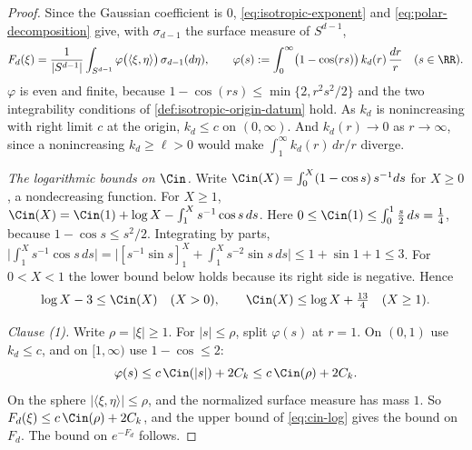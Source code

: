 \begin{proof}
\leanok
Since the Gaussian coefficient is $0$, \ref{eq:isotropic-exponent} and \ref{eq:polar-decomposition}
give, with $\sigma_{d-1}$ the surface measure of $S^{d-1}$,
\[
  F_d(\xi) = \frac{1}{|S^{d-1}|}\int_{S^{d-1}}\varphi\bigl(\langle\xi,\eta\rangle\bigr)\,\sigma_{d-1}(d\eta),
  \qquad
  \varphi(s) := \int_0^\infty\bigl(1 - \cos(rs)\bigr)\,k_d(r)\,\frac{dr}{r} \quad (s \in \RR).
\]
$\varphi$ is even and finite, because $1 - \cos(rs) \le \min\{2, r^2s^2/2\}$ and the two
integrability conditions of \ref{def:isotropic-origin-datum} hold. As $k_d$ is nonincreasing with
right limit $c$ at the origin, $k_d \le c$ on $(0,\infty)$. And $k_d(r) \to 0$ as $r \to \infty$,
since a nonincreasing $k_d \ge \ell > 0$ would make $\int_1^\infty k_d(r)\,dr/r$ diverge.

\emph{The logarithmic bounds on $\Cin$.} Write $\Cin(X) = \int_0^X(1-\cos s)\,s^{-1}ds$ for
$X \ge 0$, a nondecreasing function. For $X \ge 1$,
$\Cin(X) = \Cin(1) + \log X - \int_1^X s^{-1}\cos s\,ds$. Here $0 \le \Cin(1) \le \int_0^1 \tfrac s2\,ds
= \tfrac14$, because $1 - \cos s \le s^2/2$. Integrating by parts,
$\bigl|\int_1^X s^{-1}\cos s\,ds\bigr| = \bigl|[s^{-1}\sin s]_1^X + \int_1^X s^{-2}\sin s\,ds\bigr|
\le 1 + \sin 1 + 1 \le 3$. For $0 < X < 1$ the lower bound below holds because its right side is
negative. Hence
\begin{equation}\label{eq:cin-log}
  \log X - 3 \le \Cin(X) \quad (X > 0),
  \qquad
  \Cin(X) \le \log X + \tfrac{13}{4} \quad (X \ge 1).
\end{equation}

\emph{Clause (1).} Write $\rho = |\xi| \ge 1$. For $|s| \le \rho$, split $\varphi(s)$ at $r = 1$.
On $(0,1)$ use $k_d \le c$, and on $[1,\infty)$ use $1 - \cos \le 2$:
\[
  \varphi(s) \le c\,\Cin(|s|) + 2C_k \le c\,\Cin(\rho) + 2C_k .
\]
On the sphere $|\langle\xi,\eta\rangle| \le \rho$, and the normalized surface measure has mass $1$.
So $F_d(\xi) \le c\,\Cin(\rho) + 2C_k$, and the upper bound of \ref{eq:cin-log} gives the bound on
$F_d$. The bound on $e^{-F_d}$ follows.


\end{proof}
